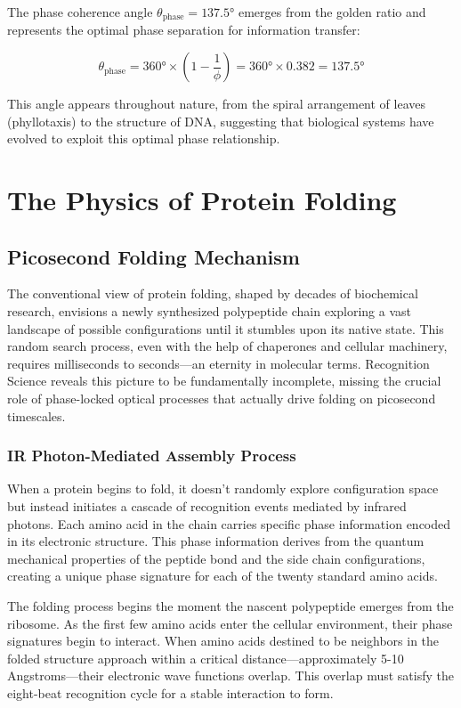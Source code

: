 \documentclass[12pt,a4paper]{report}
\begin{document}
The phase coherence angle $\theta_{\text{phase}} = 137.5°$ emerges from the golden ratio and represents the optimal phase separation for information transfer:

\begin{equation}
\theta_{\text{phase}} = 360° \times \left(1 - \frac{1}{\phi}\right) = 360° \times 0.382 = 137.5°
\end{equation}

This angle appears throughout nature, from the spiral arrangement of leaves (phyllotaxis) to the structure of DNA, suggesting that biological systems have evolved to exploit this optimal phase relationship.

\chapter{The Physics of Protein Folding}

\section{Picosecond Folding Mechanism}

The conventional view of protein folding, shaped by decades of biochemical research, envisions a newly synthesized polypeptide chain exploring a vast landscape of possible configurations until it stumbles upon its native state. This random search process, even with the help of chaperones and cellular machinery, requires milliseconds to seconds—an eternity in molecular terms. Recognition Science reveals this picture to be fundamentally incomplete, missing the crucial role of phase-locked optical processes that actually drive folding on picosecond timescales.

\subsection{IR Photon-Mediated Assembly Process}

When a protein begins to fold, it doesn't randomly explore configuration space but instead initiates a cascade of recognition events mediated by infrared photons. Each amino acid in the chain carries specific phase information encoded in its electronic structure. This phase information derives from the quantum mechanical properties of the peptide bond and the side chain configurations, creating a unique phase signature for each of the twenty standard amino acids.

The folding process begins the moment the nascent polypeptide emerges from the ribosome. As the first few amino acids enter the cellular environment, their phase signatures begin to interact. When amino acids destined to be neighbors in the folded structure approach within a critical distance—approximately 5-10 Angstroms—their electronic wave functions overlap. This overlap must satisfy the eight-beat recognition cycle for a stable interaction to form.
\end{document}
